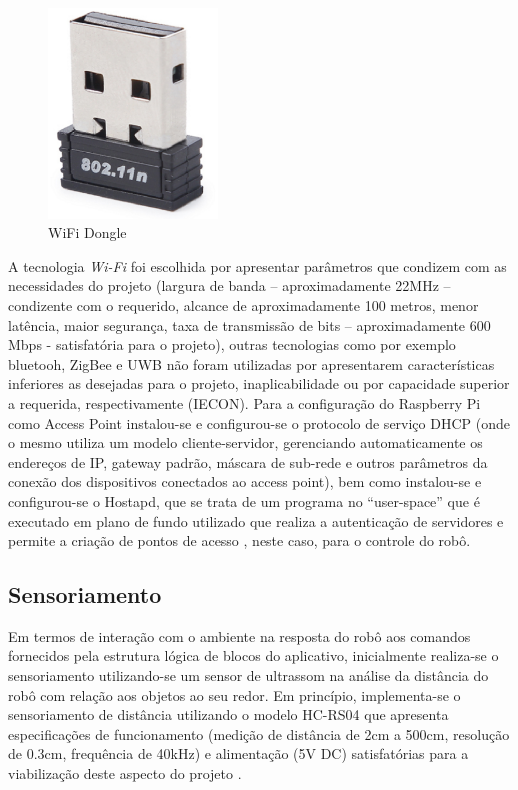 \begin{figure}[H]
    \centering
    \includegraphics[width=0.4\textwidth]{figuras/adaptador_wifi.eps}
    \caption{WiFi Dongle}
    \label{fig:wireless}
\end{figure}

A tecnologia \textit{Wi-Fi} foi escolhida por apresentar parâmetros que condizem com as necessidades do projeto (largura de banda – aproximadamente
22MHz – condizente com o requerido, alcance de aproximadamente 100 metros, menor latência, maior segurança, taxa de transmissão de bits –
aproximadamente 600 Mbps - satisfatória para o projeto), outras tecnologias como por exemplo bluetooh, ZigBee e UWB não foram utilizadas
por apresentarem características inferiores as desejadas para o projeto, inaplicabilidade ou por capacidade superior a requerida,
respectivamente (IECON). Para a configuração do Raspberry Pi como Access Point instalou-se e configurou-se o protocolo de serviço DHCP
(onde o mesmo utiliza um modelo cliente-servidor, gerenciando automaticamente os endereços de IP, gateway padrão, máscara de sub-rede e
outros parâmetros da conexão dos dispositivos conectados ao access point), bem como instalou-se e configurou-se o Hostapd, que se trata
de um programa no “user-space” que é executado em plano de fundo utilizado que realiza a autenticação de servidores e permite a criação
de pontos de acesso \cite{wireless:2015}, neste caso, para o controle do robô.

\subsection{Sensoriamento}

Em termos de interação com o ambiente na resposta do robô aos comandos fornecidos pela estrutura lógica de blocos do aplicativo,
inicialmente realiza-se o sensoriamento utilizando-se um sensor de ultrassom na análise da distância do robô com relação aos objetos
ao seu redor. Em princípio, implementa-se o sensoriamento de distância utilizando o modelo HC-RS04 que apresenta especificações de
funcionamento (medição de distância de 2cm a 500cm, resolução de 0.3cm, frequência de 40kHz) e alimentação (5V DC) satisfatórias para
a viabilização deste aspecto do projeto \cite{micropik:2015}.

